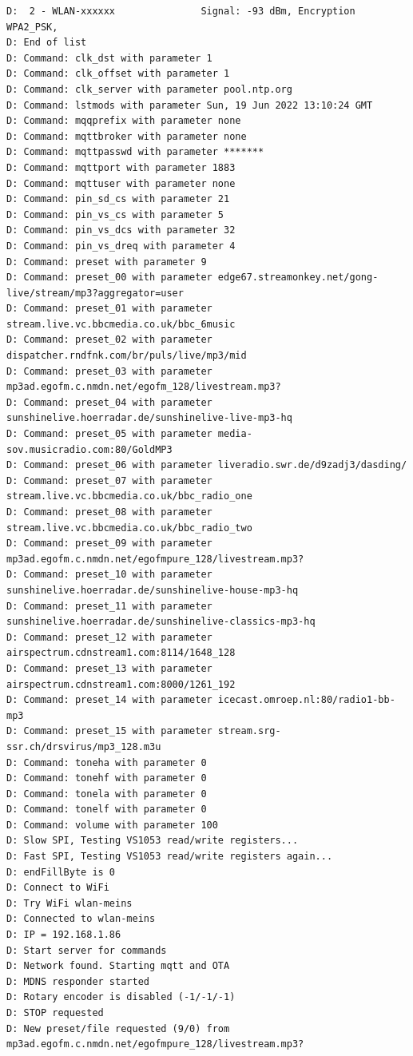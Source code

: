 \documentclass[ngerman,11pt,parskip=half] {scrartcl}
\begin{document}
\begin{lstlisting}
D:  2 - WLAN-xxxxxx               Signal: -93 dBm, Encryption WPA2_PSK, 
D: End of list
D: Command: clk_dst with parameter 1
D: Command: clk_offset with parameter 1
D: Command: clk_server with parameter pool.ntp.org
D: Command: lstmods with parameter Sun, 19 Jun 2022 13:10:24 GMT
D: Command: mqqprefix with parameter none
D: Command: mqttbroker with parameter none
D: Command: mqttpasswd with parameter *******
D: Command: mqttport with parameter 1883
D: Command: mqttuser with parameter none
D: Command: pin_sd_cs with parameter 21
D: Command: pin_vs_cs with parameter 5
D: Command: pin_vs_dcs with parameter 32
D: Command: pin_vs_dreq with parameter 4
D: Command: preset with parameter 9
D: Command: preset_00 with parameter edge67.streamonkey.net/gong-live/stream/mp3?aggregator=user
D: Command: preset_01 with parameter stream.live.vc.bbcmedia.co.uk/bbc_6music
D: Command: preset_02 with parameter dispatcher.rndfnk.com/br/puls/live/mp3/mid
D: Command: preset_03 with parameter mp3ad.egofm.c.nmdn.net/egofm_128/livestream.mp3?
D: Command: preset_04 with parameter sunshinelive.hoerradar.de/sunshinelive-live-mp3-hq
D: Command: preset_05 with parameter media-sov.musicradio.com:80/GoldMP3
D: Command: preset_06 with parameter liveradio.swr.de/d9zadj3/dasding/
D: Command: preset_07 with parameter stream.live.vc.bbcmedia.co.uk/bbc_radio_one
D: Command: preset_08 with parameter stream.live.vc.bbcmedia.co.uk/bbc_radio_two
D: Command: preset_09 with parameter mp3ad.egofm.c.nmdn.net/egofmpure_128/livestream.mp3?
D: Command: preset_10 with parameter sunshinelive.hoerradar.de/sunshinelive-house-mp3-hq
D: Command: preset_11 with parameter sunshinelive.hoerradar.de/sunshinelive-classics-mp3-hq
D: Command: preset_12 with parameter airspectrum.cdnstream1.com:8114/1648_128
D: Command: preset_13 with parameter airspectrum.cdnstream1.com:8000/1261_192
D: Command: preset_14 with parameter icecast.omroep.nl:80/radio1-bb-mp3
D: Command: preset_15 with parameter stream.srg-ssr.ch/drsvirus/mp3_128.m3u
D: Command: toneha with parameter 0
D: Command: tonehf with parameter 0
D: Command: tonela with parameter 0 
D: Command: tonelf with parameter 0
D: Command: volume with parameter 100
D: Slow SPI, Testing VS1053 read/write registers...
D: Fast SPI, Testing VS1053 read/write registers again...
D: endFillByte is 0
D: Connect to WiFi
D: Try WiFi wlan-meins
D: Connected to wlan-meins
D: IP = 192.168.1.86
D: Start server for commands
D: Network found. Starting mqtt and OTA
D: MDNS responder started
D: Rotary encoder is disabled (-1/-1/-1)
D: STOP requested 
D: New preset/file requested (9/0) from mp3ad.egofm.c.nmdn.net/egofmpure_128/livestream.mp3?

\end{lstlisting}
\end{document}
